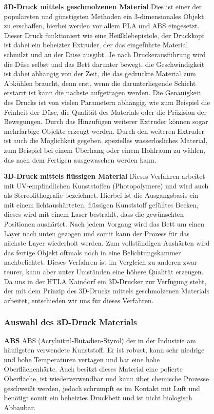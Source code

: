 \begin{figure}
\textbf{3D-Druck mittels geschmolzenen Material}
Dies ist einer der populärsten und günstigsten Methoden ein 3-dimensionales Objekt zu erschaffen, hierbei werden vor allem PLA und
ABS eingesetzt. Dieser Druck funktioniert wie eine Heißklebepistole, der Druckkopf ist dabei ein beheizter Extruder, der
das eingeführte Material schmilzt und an der Düse ausgibt. Je nach Druckerausführung wird die Düse selbst und das Bett
darunter bewegt, die Geschwindigkeit ist dabei abhängig von der Zeit, die das gedruckte Material zum Abkühlen braucht,
denn erst, wenn die darunterliegende Schicht erstarrt ist kann die nächste aufgetragen werden. Die Genauigkeit des Drucks
ist von vielen Parametern abhängig, wie zum Beispiel die Feinheit der Düse, die Qualität des Materials oder die Präzision
der Bewegungen. Durch das Hinzufügen weiterer Extruder können sogar mehrfarbige Objekte erzeugt werden. Durch den
weiteren Extruder ist auch die Möglichkeit gegeben, spezielles wasserlösliches Material, zum Beispiel bei einem Überhang
oder einem Hohlraum zu wählen, das nach dem Fertigen ausgewaschen werden kann.

\textbf{3D-Druck mittels flüssigen Material}
Dieses Verfahren arbeitet mit UV-empfindlichen Kunststoffen (Photopolymere) und wird auch als Stereolithografie bezeichnet.
Hierbei ist die Ausgangsbasis ein mit einem lichtaushärteten, flüssigen Kunststoff gefülltes Becken, dieses wird mit
einem Laser bestrahlt, dass die gewünschten Positionen aushärtet. Nach jedem Vorgang wird das Bett um einen Layer nach
unten gezogen und somit kann der Prozess für das nächste Layer wiederholt werden. Zum vollständigen Aushärten wird
das fertige Objekt oftmals noch in eine Belichtungskammer nachbelichtet. Dieses Verfahren ist im Vergleich zu anderen
zwar teurer, kann aber unter Umständen eine höhere Qualität erzeugen. \\

Da uns in der HTLA Kaindorf ein 3D-Drucker zur Verfügung steht, der mit dem Prinzip des 3D-Drucks mittels geschmolzenen Materials
arbeitet, entschieden wir uns für dieses Verfahren.

\subsubsection{Auswahl des 3D-Druck Materials}

\textbf{ABS}
ABS (Acrylnitril-Butadien-Styrol) der in der Industrie am häufigsten verwendete Kunststoff. Er ist robust, kann sehr
niedrige und hohe Temperaturen vertagen und hat eine hohe Oberflächenhärte. Auch besitzt dieses Material eine polierte Oberfläche,
ist wiederverwendbar und kann über chemische Prozesse geschweißt werden, jedoch schrumpft es im Kontakt mit Luft und benötigt somit ein beheiztes Druckbett und ist
nicht biologisch Abbaubar.


\end{figure}
